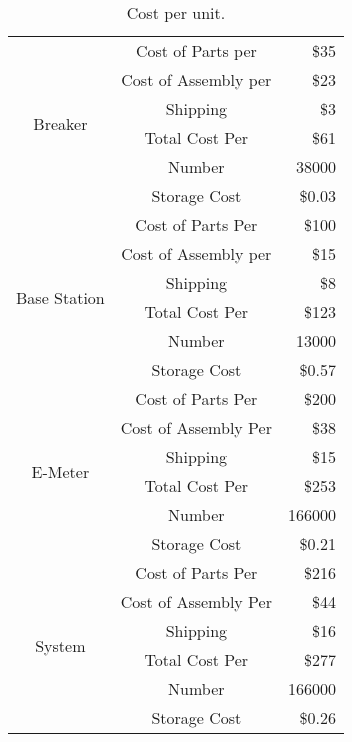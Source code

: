 \begin{table}[htbp]
\begin{center}
\caption{Cost per unit.}
\begin{tabular}{|c|c|r|}\hline
\multirow{6}{*}{Breaker} & Cost of Parts per    & \$35\\\cline{2-3}
                         & Cost of Assembly per & \$23\\\cline{2-3}
                         & Shipping             & \$3\\\cline{2-3}
                         & Total Cost Per       & \$61\\\cline{2-3}
                         & Number               & 38000\\\cline{2-3}
                         & Storage Cost         & \$0.03\\\hline\hline
\multirow{6}{*}{Base Station} & Cost of Parts Per    & \$100\\\cline{2-3}
                              & Cost of Assembly per & \$15\\\cline{2-3}
                              & Shipping             & \$8\\\cline{2-3}
                              & Total Cost Per       & \$123\\\cline{2-3}
                              & Number               & 13000\\\cline{2-3}
                              & Storage Cost         & \$0.57\\\hline\hline
\multirow{6}{*}{E-Meter} & Cost of Parts Per    & \$200\\\cline{2-3}
                         & Cost of Assembly Per & \$38\\\cline{2-3}
                         & Shipping             & \$15\\\cline{2-3}
                         & Total Cost Per       & \$253\\\cline{2-3}
                         & Number               & 166000\\\cline{2-3}
                         & Storage Cost         & \$0.21\\\hline\hline
\multirow{6}{*}{System} & Cost of Parts Per    & \$216\\\cline{2-3}
                        & Cost of Assembly Per & \$44\\\cline{2-3}
                        & Shipping             & \$16\\\cline{2-3}
                        & Total Cost Per       & \$277\\\cline{2-3}
                        & Number               & 166000\\\cline{2-3}
                        & Storage Cost         & \$0.26\\\hline\hline
\end{tabular}
\label{tab:costs_per}
\end{center}
\end{table}

